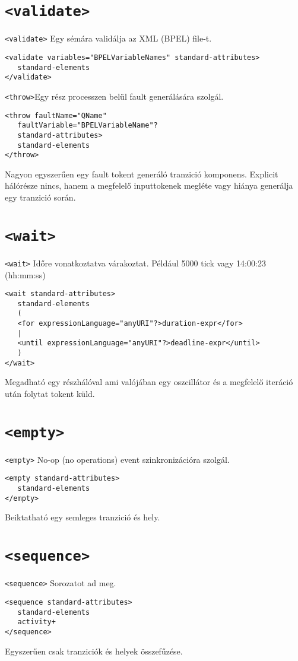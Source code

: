 \section{\texttt{<validate>}}
\texttt{<validate>} Egy sémára validálja az XML (BPEL) file-t. 
\begin{verbatim}
<validate variables="BPELVariableNames" standard-attributes>
   standard-elements
</validate>
\end{verbatim}
\texttt{<throw>}Egy rész processzen belül fault generálására szolgál. 
\begin{verbatim}
<throw faultName="QName"
   faultVariable="BPELVariableName"?
   standard-attributes>
   standard-elements
</throw>
\end{verbatim}
Nagyon egyszerűen egy fault tokent generáló tranzició komponens. Explicit hálórésze nincs, hanem a megfelelő inputtokenek megléte vagy hiánya generálja egy tranzició során. 

\section{\texttt{<wait>}}
\texttt{<wait>} Időre vonatkoztatva várakoztat. Például 5000 tick vagy 14:00:23 (hh:mm:ss)
\begin{verbatim} 
<wait standard-attributes>
   standard-elements
   (
   <for expressionLanguage="anyURI"?>duration-expr</for>
   |
   <until expressionLanguage="anyURI"?>deadline-expr</until>
   )
</wait>
\end{verbatim}
Megadható egy részhálóval ami valójában egy oszcillátor és a megfelelő iteráció után folytat tokent küld. 

\section{\texttt{<empty>}}
\texttt{<empty>} No-op (no operations) event szinkronizációra szolgál.
\begin{verbatim}
<empty standard-attributes>
   standard-elements
</empty>
\end{verbatim}
Beiktatható egy semleges tranzició és hely.

\section{\texttt{<sequence>} }
\texttt{<sequence>} Sorozatot ad meg.
\begin{verbatim}
<sequence standard-attributes>
   standard-elements
   activity+
</sequence>
\end{verbatim} Egyszerűen csak tranziciók és helyek összefűzése. 

